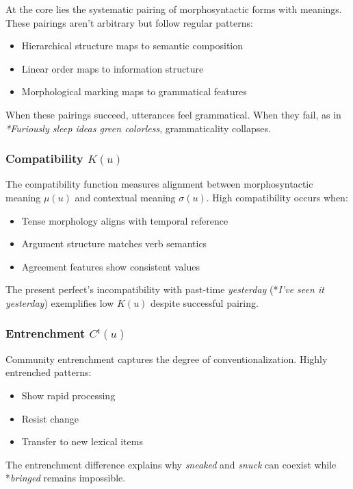 \documentclass[12pt]{article}
\begin{document}
At the core lies the systematic pairing of morphosyntactic forms with meanings. These pairings aren't arbitrary but follow regular patterns:
\begin{itemize}
    \item Hierarchical structure maps to semantic composition
    \item Linear order maps to information structure  
    \item Morphological marking maps to grammatical features
\end{itemize}
When these pairings succeed, utterances feel grammatical. When they fail, as in \textit{*Furiously sleep ideas green colorless}, grammaticality collapses.

\subsubsection{Compatibility \texorpdfstring{$K(u)$}{K(u)}}

The compatibility function measures alignment between morphosyntactic meaning $\mu(u)$ and contextual meaning $\sigma(u)$. High compatibility occurs when:
\begin{itemize}
    \item Tense morphology aligns with temporal reference
    \item Argument structure matches verb semantics
    \item Agreement features show consistent values
\end{itemize}
The present perfect's incompatibility with past-time \textit{yesterday} (*\textit{I've seen it yesterday}) exemplifies low $K(u)$ despite successful pairing.

\subsubsection{Entrenchment \texorpdfstring{$C^{t}(u)$}{C\^{}t(u)}}

Community entrenchment captures the degree of conventionalization. Highly entrenched patterns:
\begin{itemize}
    \item Show rapid processing
    \item Resist change
    \item Transfer to new lexical items
\end{itemize}
The entrenchment difference explains why \textit{sneaked} and \textit{snuck} can coexist while *\textit{bringed} remains impossible.
\end{document}
